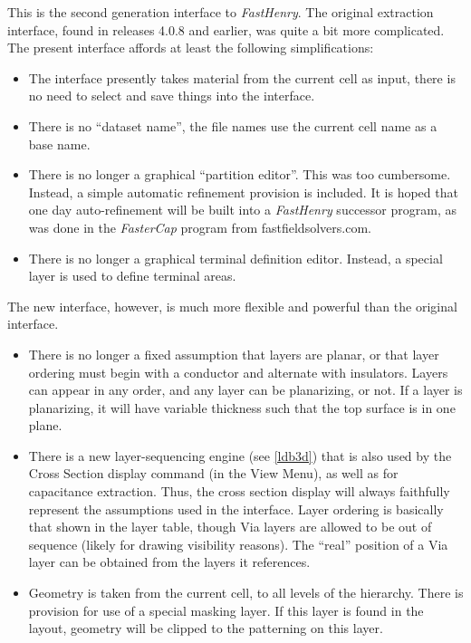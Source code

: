 This is the second generation interface to {\it FastHenry}.  The
original extraction interface, found in releases 4.0.8 and earlier,
was quite a bit more complicated.  The present interface affords at
least the following simplifications:

\begin{itemize}
\item{The interface presently takes material from the current cell
as input, there is no need to select and save things into the
interface.}

\item{There is no ``dataset name'', the file names use the current
cell name as a base name.}

\item{There is no longer a graphical ``partition editor''.  This was
too cumbersome.  Instead, a simple automatic refinement provision is
included.  It is hoped that one day auto-refinement will be built into
a {\it FastHenry} successor program, as was done in the {\it
FasterCap} program from {\vt fastfieldsolvers.com}.}

\item{There is no longer a graphical terminal definition editor. 
Instead, a special layer is used to define terminal areas.}
\end{itemize}

The new interface, however, is much more flexible and powerful than
the original interface.

\begin{itemize}
\item{There is no longer a fixed assumption that layers are planar, or
that layer ordering must begin with a conductor and alternate with
insulators.  Layers can appear in any order, and any layer can be
planarizing, or not.  If a layer is planarizing, it will have variable
thickness such that the top surface is in one plane.}

\item{There is a new layer-sequencing engine (see \ref{ldb3d}) that is
also used by the {\cb Cross Section} display command (in the {\cb View
Menu}), as well as for capacitance extraction.  Thus, the cross
section display will always faithfully represent the assumptions used
in the interface.  Layer ordering is basically that shown in the layer
table, though {\et Via} layers are allowed to be out of sequence
(likely for drawing visibility reasons).  The ``real'' position of a
{\et Via} layer can be obtained from the layers it references.}

\item{Geometry is taken from the current cell, to all levels of the
hierarchy.  There is provision for use of a special masking layer.  If
this layer is found in the layout, geometry will be clipped to the
patterning on this layer.}
\end{itemize}

